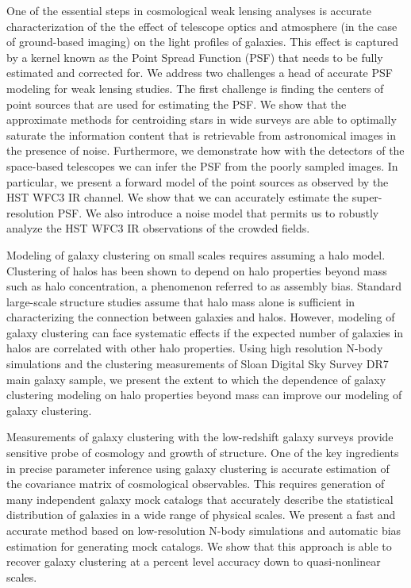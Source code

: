 One of the essential steps in cosmological weak lensing analyses is accurate characterization of the the effect of telescope optics and atmosphere (in the case of ground-based imaging) on the light profiles of galaxies. This effect is captured by a kernel known as the Point Spread Function (PSF) that needs to be fully estimated and corrected for. We address two challenges a head of accurate PSF modeling for weak lensing studies. The first challenge is finding the centers of point sources that are used for estimating the PSF. We show that the approximate methods for centroiding stars in wide surveys are able to optimally saturate the information content that is retrievable from astronomical images in the presence of noise. Furthermore, we demonstrate how with the detectors of the space-based telescopes we can infer the PSF from the poorly sampled images. In particular, we present a 
forward model of the point sources as observed by the HST WFC3 IR channel. We show that we can accurately estimate the super-resolution PSF. We also introduce a noise model that permits us to robustly analyze the HST WFC3 IR observations of the crowded fields.    

Modeling of galaxy clustering on small scales requires assuming a halo model. Clustering of halos has been shown to depend on halo properties beyond mass such as halo concentration, a phenomenon referred to as assembly bias. Standard large-scale structure studies assume that halo mass alone is sufficient in characterizing the connection between galaxies and halos. However, modeling of galaxy clustering can face systematic effects if the expected number of galaxies in halos are correlated with other halo properties. Using high resolution N-body simulations and the clustering measurements of Sloan Digital Sky Survey DR7 main galaxy sample, we present the extent to which the dependence of galaxy clustering modeling on halo properties beyond mass can improve our modeling of galaxy clustering.

Measurements of galaxy clustering with the low-redshift galaxy surveys provide sensitive probe of cosmology and growth of structure. One of the key ingredients in precise parameter inference using galaxy clustering is accurate estimation of the covariance matrix of cosmological observables. This requires generation of many independent galaxy mock catalogs that accurately describe the statistical distribution of galaxies in a wide range of physical scales. We present a fast and accurate method based on low-resolution N-body simulations and automatic bias estimation for generating mock catalogs. We show that this approach is able to recover galaxy clustering at a percent level accuracy down to quasi-nonlinear scales. 

